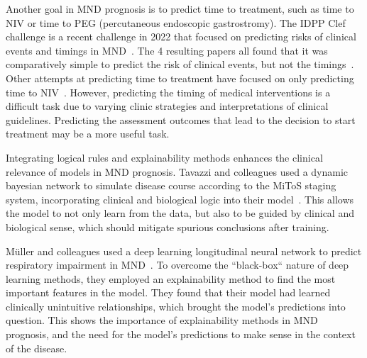 Another goal in MND prognosis is to predict time to treatment, such as time to NIV or time to PEG (percutaneous endoscopic gastrostromy).
The IDPP Clef challenge is a recent challenge in 2022 that focused on predicting risks of clinical events and timings in MND~\cite{guazzoOverviewIDPPCLEF2022}.
The 4 resulting papers all found that it was comparatively simple to predict the risk of clinical events, but not the timings~\cite{brancoHierarchicalModellingALS2022, mannionPredictingRiskTime2022, trescatoBaselineMachineLearning2022, pancottiMultiEventSurvivalPrediction2022}.
Other attempts at predicting time to treatment have focused on only predicting time to NIV~\cite{carreiroPrognosticModelsBased2015, pereiraPredictingAssistedVentilation2019}.
However, predicting the timing of medical interventions is a difficult task due to varying clinic strategies and interpretations of clinical guidelines.
Predicting the assessment outcomes that lead to the decision to start treatment may be a more useful task.

Integrating logical rules and explainability methods enhances the clinical relevance of models in MND prognosis.
Tavazzi and colleagues used a dynamic bayesian network to simulate disease course according to the MiToS staging system, incorporating clinical and biological logic into their model~\cite{tavazziPredictingFunctionalImpairment2022}.
This allows the model to not only learn from the data, but also to be guided by clinical and biological sense, which should mitigate spurious conclusions after training.

Müller and colleagues used a deep learning longitudinal neural network to predict respiratory impairment in MND~\cite{mullerExplainableModelsDisease2021}.
To overcome the ``black-box`` nature of deep learning methods, they employed an explainability method to find the most important features in the model.
They found that their model had learned clinically unintuitive relationships, which brought the model's predictions into question.
This shows the importance of explainability methods in MND prognosis, and the need for the model's predictions to make sense in the context of the disease.


